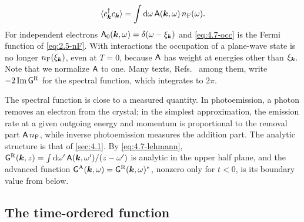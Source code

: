 \begin{equation}
  \langle c^\dagger_{\bm{k}}c_{\bm{k}}\rangle = \int\mathrm{d}\omega\,\mathsf{A}(\bm{k},\omega)\,n_{\mathrm{F}}(\omega) .
  \label{eq:4.7-occ}
\end{equation}
For independent electrons $\mathsf{A}_0(\bm{k},\omega) = \delta(\omega - \xi_{\bm{k}})$ and \cref{eq:4.7-occ} is the Fermi function of \cref{eq:2.5-nF}. With interactions the occupation of a plane-wave state is no longer $n_{\mathrm{F}}(\xi_{\bm{k}})$, even at $T = 0$, because $\mathsf{A}$ has weight at energies other than $\xi_{\bm{k}}$. Note that we normalize $\mathsf{A}$ to one. Many texts, Refs.~\cite{bruus2004many,mahan2000many} among them, write $-2\operatorname{Im}\mathsf{G}^{\mathrm{R}}$ for the spectral function, which integrates to $2\pi$.

The spectral function is close to a measured quantity. In photoemission, a photon removes an electron from the crystal; in the simplest approximation, the emission rate at a given outgoing energy and momentum is proportional to the removal part $\mathsf{A}\,n_{\mathrm{F}}$, while inverse photoemission measures the addition part. The analytic structure is that of \cref{sec:4.1}. By \cref{eq:4.7-lehmann}, $\mathsf{G}^{\mathrm{R}}(\bm{k},z) = \int\mathrm{d}\omega'\,\mathsf{A}(\bm{k},\omega')/(z - \omega')$ is analytic in the upper half plane, and the advanced function $\mathsf{G}^{\mathrm{A}}(\bm{k},\omega) = \mathsf{G}^{\mathrm{R}}(\bm{k},\omega)^*$, nonzero only for $t < 0$, is its boundary value from below.

\subsection{The time-ordered function}

